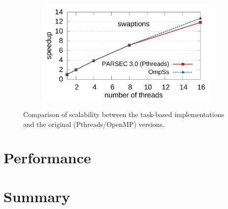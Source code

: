 \begin{figure}[ht]
				\centering
        \begin{subfigure}[b]{0.8\textwidth}
                \includegraphics[width=\textwidth]{ifcg/figures/swaptions_scale}
                \label{fig:swaptions_scale}
        \end{subfigure}
      \caption{Comparison of scalability between the task-based implementations and the original (Pthreads/OpenMP) versions.}
			\label{fig:scalability_graphs_4}
			\vspace{.5cm}
\end{figure}





\section{Performance}
\label{sec:task_bench_evaluation}


\section{Summary}

